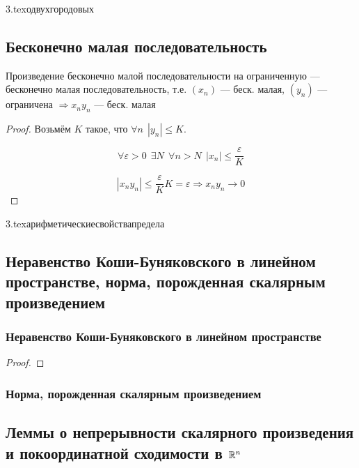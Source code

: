 {3.tex}{одвухгородовых}

\subsection{Бесконечно малая последовательность}
Произведение бесконечно малой последовательности на ограниченную --- бесконечно малая последовательность, т.е. $(x_n)$ --- беск. малая, $(y_n)$ --- ограничена $\Rightarrow x_ny_n$ --- беск. малая
\begin{proof}
    Возьмём $K$ такое, что $\forall n \ \ |y_n|\leq K$.

    $$\forall \varepsilon > 0 \ \ \exists N \ \ \forall n > N \ \ |x_n|\leq\frac{\varepsilon}{K}$$

    $$|x_ny_n|\leq\frac{\varepsilon}{K}K=\varepsilon \Rightarrow x_ny_n\to0$$
\end{proof}

{3.tex}{арифметическиесвойствапредела}

\subsection{Неравенство Коши-Буняковского в линейном пространстве, норма, порожденная скалярным произведением}
\subsubsection{Неравенство Коши-Буняковского в линейном пространстве}
\begin{proof}
\end{proof}
\subsubsection{Норма, порожденная скалярным произведением}

\subsection{Леммы о непрерывности скалярного произведения и покоординатной сходимости в $\mathbb{R}^n$}
